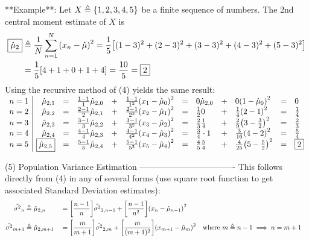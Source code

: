 **Example**:
Let $X \triangleq \left\{1,2,3,4,5\right\}$ be a finite sequence of numbers.
The 2nd central moment estimate of $X$ is
\begin{align*}
  \boxed{\hat{\mu}_2} &\triangleq \frac{1}{N}\sum_{n=1}^N {\left(x_n -\hat{\mu}\right)}^2
                     =    \frac{1}{5}{\left[ (1-3)^2 + (2-3)^2 + (3-3)^2 + (4-3)^2 + (5-3)^2 \right]}
                  \\&=    \frac{1}{5}{\left[ 4 + 1 + 0 + 1 + 4 \right]}
                     =    \frac{10}{5}
                     =    \boxed{2}
\end{align*}
Using the recursive method of (4) yields the same result:  
$\begin{array}{l|rclcl clcl clcl cl}
  n=1 & \hat{\mu}_{2,1} &=& \frac{1-1}{1}\hat{\mu}_{2,0} &+& \frac{1-1}{1^2}{\left( x_1 - \hat{\mu}_0  \right)}^2
                       &=& 0            \hat{\mu}_{2,0} &+& 0              {\left( 1      - \hat{\mu}_0  \right)}^2
                       &=& 0\\
  n=2 & \hat{\mu}_{2,2} &=& \frac{2-1}{2}\hat{\mu}_{2,1} &+& \frac{2-1}{2^2}{\left( x_2 - \hat{\mu}_1  \right)}^2
                       &=& \frac{1}{2}  0              &+& \frac{1}{4}    {\left( 2      - 1           \right)}^2
                       &=& \frac{1}{4}\\
  n=3 & \hat{\mu}_{2,3} &=& \frac{3-1}{3}\hat{\mu}_{2,2} &+& \frac{3-1}{3^2}{\left( x_3 - \hat{\mu}_2  \right)}^2
                       &=& \frac{2}{3}  \frac{1}{4}    &+& \frac{2}{9}    {\left( 3      - \frac{3}{2} \right)}^2
                       &=& \frac{2}{3}\\
  n=4 & \hat{\mu}_{2,4} &=& \frac{4-1}{4}\hat{\mu}_{2,3} &+& \frac{4-1}{4^2}{\left( x_4 - \hat{\mu}_3  \right)}^2
                       &=& \frac{3}{4}  \cdot 1        &+& \frac{3}{16}   {\left( 4      - 2           \right)}^2
                       &=& \frac{5}{4}\\
  n=5 & \boxed{\hat{\mu}_{2,5}} &=& \frac{5-1}{5}\hat{\mu}_{2,4} &+& \frac{5-1}{5^2}{\left( x_5 - \hat{\mu}_4  \right)}^2
                       &=& \frac{4}{5}  \frac{5}{4}    &+& \frac{4}{25}   {\left( 5      - \frac{5}{2} \right)}^2
                       &=& \boxed{2}
\end{array}$

(5) Population Variance Estimation
----------------------------------
This follows directly from (4) in any of several forms (use square root function to get associated Standard Deviation estimates):
\begin{align*}
  \hat{\sigma^2}_n
    &\triangleq \hat{\mu}_{2,n}
   &&= {\left[\frac{n-1}{n}\right]}\hat{\sigma^2}_{2,n-1} + {\left[ \frac{n-1}{n^2} \right]} {\left( x_n - \hat{\mu}_{n-1} \right)}^2
   \\
  \hat{\sigma^2}_{m+1}
    &\triangleq \hat{\mu}_{2,m+1}
   &&=    {\left[\frac{m}{m+1}\right]}\hat{\sigma^2}_{2,m} + {\left[ \frac{m}{(m+1)^2} \right]} {\left( x_{m+1} - \hat{\mu}_{m} \right)}^2
   &&     \text{where $m\triangleq n-1\implies n=m+1$}
\end{align*}

